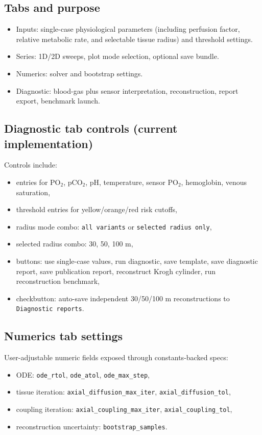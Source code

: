 \documentclass[12pt,a4paper]{article}
\begin{document}
\subsection{Tabs and purpose}
\begin{itemize}
    \item Inputs: single-case physiological parameters (including perfusion factor, relative metabolic rate, and selectable tissue radius) and threshold settings.
    \item Series: 1D/2D sweeps, plot mode selection, optional save bundle.
    \item Numerics: solver and bootstrap settings.
    \item Diagnostic: blood-gas plus sensor interpretation, reconstruction, report export, benchmark launch.
\end{itemize}

\subsection{Diagnostic tab controls (current implementation)}
Controls include:
\begin{itemize}
    \item entries for PO$_2$, pCO$_2$, pH, temperature, sensor PO$_2$, hemoglobin, venous saturation,
    \item threshold entries for yellow/orange/red risk cutoffs,
    \item radius mode combo: \texttt{all variants} or \texttt{selected radius only},
    \item selected radius combo: 30, 50, 100 \textmu m,
    \item buttons: use single-case values, run diagnostic, save template, save diagnostic report, save publication report, reconstruct Krogh cylinder, run reconstruction benchmark,
    \item checkbutton: auto-save independent 30/50/100 \textmu m reconstructions to \texttt{Diagnostic reports}.
\end{itemize}

\subsection{Numerics tab settings}
User-adjustable numeric fields exposed through constants-backed specs:
\begin{itemize}
    \item ODE: \texttt{ode\_rtol}, \texttt{ode\_atol}, \texttt{ode\_max\_step},
    \item tissue iteration: \texttt{axial\_diffusion\_max\_iter}, \texttt{axial\_diffusion\_tol},
    \item coupling iteration: \texttt{axial\_coupling\_max\_iter}, \texttt{axial\_coupling\_tol},
    \item reconstruction uncertainty: \texttt{bootstrap\_samples}.
\end{itemize}
\end{document}
